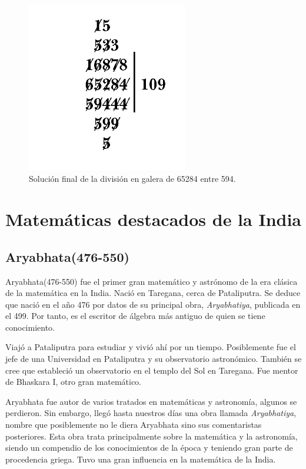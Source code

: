 \documentclass[a4paper, 11pt]{article}
\begin{document}
		\begin{figure}[!ht]
			\centering
			\includegraphics[width = 7cm]{Galley_Method4.png}
			\caption{Solución final de la división en galera de 65284 entre 594.}
			\label{fig:ind_division2}
		\end{figure}
		
\section{Matemáticas destacados de la India}
	\subsection{Aryabhata(476-550)}
		Aryabhata(476-550) fue el primer gran matemático y astrónomo de la era clásica de la matemática en la India.
		Nació en Taregana, cerca de Pataliputra. Se deduce que nació en el año 476 por datos de su principal obra,
		\textit{Aryabhatiya}, publicada en el 499. Por tanto, es el escritor de álgebra más antiguo de quien se tiene
		conocimiento.
		
		Viajó a Pataliputra para estudiar y vivió ahí por un tiempo. Posiblemente fue el jefe de una Universidad en
		Pataliputra y su observatorio astronómico. También se cree que estableció un observatorio en el templo del Sol
		en Taregana. Fue mentor de Bhaskara I, otro gran matemático.
				
		Aryabhata fue autor de varios tratados en matemáticas y astronomía, algunos se perdieron. Sin embargo, llegó
		hasta nuestros días una obra llamada \textit{Aryabhatiya}, nombre que posiblemente no le diera Aryabhata sino
		sus comentaristas posteriores. Esta obra trata principalmente sobre la matemática y la astronomía, siendo un
		compendio de los conocimientos de la época y teniendo gran parte de procedencia griega. Tuvo una gran influencia
		en la matemática de la India.
\end{document}
